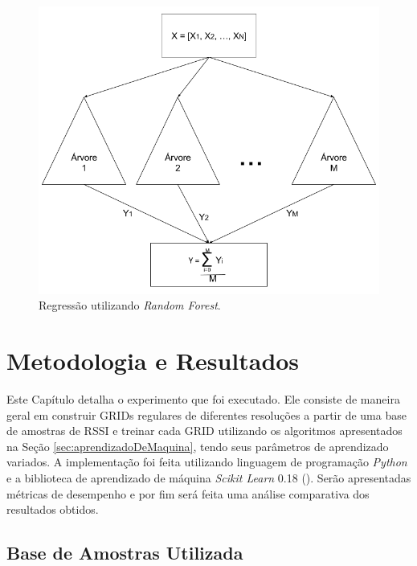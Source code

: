 \documentclass[12pt]{article}
\begin{document}
            \begin{figure}[H]
            \centering
            \includegraphics[width=16cm]{images/randomForest.png}\par
            \caption{Regressão utilizando \textit{Random Forest}.}
            \label{fig:randomForest}
            \end{figure}

    \newpage
    \section{Metodologia e Resultados}
    \label{sec:metodologia}
    
    Este Capítulo detalha o experimento que foi executado. Ele consiste de maneira geral em construir GRIDs regulares de diferentes resoluções a partir de uma base de amostras de RSSI e treinar cada GRID utilizando os algoritmos apresentados na Seção \ref{sec:aprendizadoDeMaquina}, tendo seus parâmetros de aprendizado variados. A implementação foi feita utilizando linguagem de programação \textit{Python} e a biblioteca de aprendizado de máquina \textit{Scikit Learn} 0.18 (\cite{scikitLearn}). Serão apresentadas métricas de desempenho e por fim será feita uma análise comparativa dos resultados obtidos.

        \subsection{Base de Amostras Utilizada}
        \label{sec:experimentoBaseDeDados}
\end{document}
